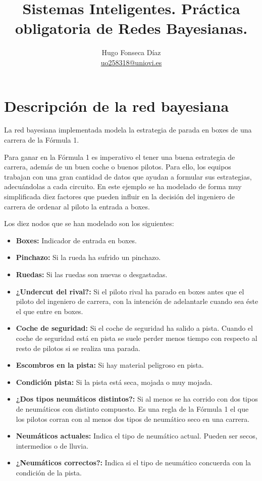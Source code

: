 \documentclass[]{article}
\begin{document}
\title{Sistemas Inteligentes. Práctica obligatoria de Redes Bayesianas.}
\author{Hugo Fonseca Díaz\\ \href{mailto:uo258318@uniovi.es}{uo258318@uniovi.es}}
\maketitle
\section{Descripción de la red bayesiana}
La red bayesiana implementada modela la estrategia de parada en boxes de una carrera de la Fórmula 1.

Para ganar en la Fórmula 1 es imperativo el tener una buena estrategia de carrera, además de un buen coche o buenos pilotos. Para ello, los equipos trabajan con una gran cantidad de datos que ayudan a formular sus estrategias, adecuándolas a cada circuito. En este ejemplo se ha modelado de forma muy simplificada diez factores que pueden influir en la decisión del ingeniero de carrera de ordenar al piloto la entrada a boxes.

Los diez nodos que se han modelado son los siguientes:
\begin{itemize}
    \item \textbf{Boxes:} Indicador de entrada en boxes.
    \item \textbf{Pinchazo:} Si la rueda ha sufrido un pinchazo.
    \item \textbf{Ruedas:} Si las ruedas son nuevas o desgastadas.
    \item \textbf{¿Undercut del rival?:} Si el piloto rival ha parado en boxes antes que el piloto del ingeniero de carrera, con la intención de adelantarle cuando sea éste el que entre en boxes.
    \item \textbf{Coche de seguridad:} Si el coche de seguridad ha salido a pista. Cuando el coche de seguridad está en pista se suele perder menos tiempo con respecto al resto de pilotos si se realiza una parada.
    \item \textbf{Escombros en la pista:} Si hay material peligroso en pista.
    \item \textbf{Condición pista:} Si la pista está seca, mojada o muy mojada.
    \item \textbf{¿Dos tipos neumáticos distintos?:} Si al menos se ha corrido con dos tipos de neumáticos con distinto compuesto. Es una regla de la Fórmula 1 el que los pilotos corran con al menos dos tipos de neumático seco en una carrera.
    \item \textbf{Neumáticos actuales:} Indica el tipo de neumático actual. Pueden ser secos, intermedios o de lluvia.
    \item \textbf{¿Neumáticos correctos?:} Indica si el tipo de neumático concuerda con la condición de la pista.
\end{itemize}
\end{document}
